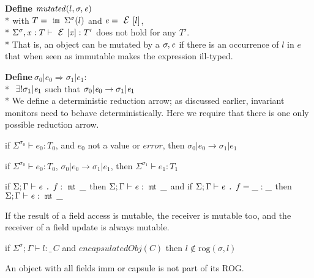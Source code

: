\noindent\textbf{Define} $\mathit{mutated}(l,\sigma,\e)$\\*
${}_{}$\quad\quad with $T=\Kw{imm}\,\Sigma^\sigma(l)$ and $\e=\ctx[l]$,\\*
${}_{}$\quad\quad $\Sigma^\sigma,\x:T\vdash\ctx[\x]:T'$ does not hold for any $T'$.\\*
\noindent That is, an object can be mutated by a $\sigma,\e$ if there is an occurrence of 
$l$ in $e$ that when seen as immutable makes the expression ill-typed.



\noindent\textbf{Define}$\ \sigma_0|e_0\Rightarrow \sigma_1|e_1$:\\*
${}_{}$\quad\quad
 $\exists! \sigma_1|\e_1$ such that $\sigma_0|\e_0\rightarrow \sigma_1|\e_1$\\*
\noindent We define
a deterministic reduction arrow;
as discussed earlier, invariant monitors need to behave deterministically.
Here we require that there is one only possible reduction arrow.



\begin{Assumption}[Progress]
if $\Sigma^{\sigma_0}\vdash e_0: T_0$,
and $e_0$ not a value or $\mathit{error}$, then
$\sigma_0|e_0\rightarrow \sigma_1|e_1$
\end{Assumption}


\begin{Assumption}[SubjectReductionBase]
if $\Sigma^{\sigma_0}\vdash e_0: T_0$,
$\sigma_0|e_0\rightarrow \sigma_1|e_1$,
then
$\Sigma^{\sigma_1}\vdash e_1: T_1$
\end{Assumption}


\begin{Assumption}[MutField]
if $\Sigma;\Gamma\vdash\e\singleDot\f:\Kw{mut}\,\_$
then $\Sigma;\Gamma\vdash\e:\Kw{mut}\,\_$
and
if $\Sigma;\Gamma\vdash\e\singleDot\f=\_:\_$
then $\Sigma;\Gamma\vdash\e:\Kw{mut}\,\_$

If the result of a field access is mutable,
the receiver is mutable too, and the receiver of a field update is always mutable.
\end{Assumption}

\begin{Assumption}[HeadNotCircular]
if   $\Sigma^\sigma;\Gamma\vdash l:\_\,C$ and $\mathit{encapsulatedObj}(C)$ 
 then $l\notin\text{rog}(\sigma,l)$

An object with all fields imm or capsule is not part of its ROG.
\end{Assumption}

